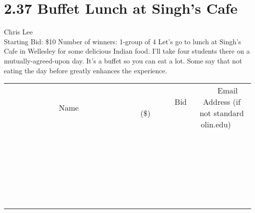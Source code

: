 \documentclass[11pt]{article}
\begin{document}
\section*{2.37 Buffet Lunch at Singh's Cafe }
Chris Lee
\\
Starting Bid: \$10
\newline
Number of winners: 1-group of 4 
\newline
Let's go to lunch at Singh's Cafe in Wellesley for some delicious Indian food.  I'll take four students there on a mutually-agreed-upon day. It's a buffet so you can eat a lot. Some say that not  eating the day before greatly enhances the experience.
\\[6ex]
\begin{tabular}{c c c}
~~~~~~~~~~~~~Name~~~~~~~~~~~~~ & ~~~~~~~~~Bid (\$)~~~~~~~~~  & ~~~Email Address (if not standard olin.edu)~~~\\
 & & \\
\hline
 & & \\
\hline
 & & \\
\hline
 & & \\
\hline
 & & \\
\hline
 & & \\
\hline
 & & \\
\hline
 & & \\
\hline
 & & \\
\hline
 & & \\
\hline
 & & \\
\hline
 & & \\
\hline
 & & \\
\hline
 & & \\
\hline
 & & \\
\hline
 & & \\
\hline
 & & \\
\hline
 & & \\
\hline
 & & \\
\hline
 & & \\
\hline
 & & \\
\hline
 & & \\
\hline
 & & \\
\hline
 & & \\
\hline
 & & \\
\hline
 & & \\
\hline
\end{tabular}
\newpage
\end{document}
